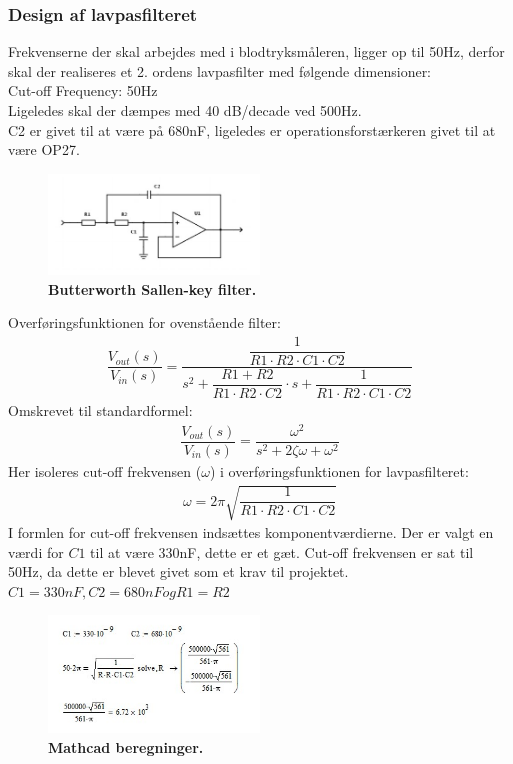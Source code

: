 \subsubsection{Design af lavpasfilteret}
Frekvenserne der skal arbejdes med i blodtryksmåleren, ligger op til 50Hz, derfor skal der realiseres et 2. ordens lavpasfilter med følgende dimensioner:\\
Cut-off Frequency: 50Hz\\
Ligeledes skal der dæmpes med 40 dB/decade ved 500Hz.\\
C2 er givet til at være på 680nF, ligeledes er operationsforstærkeren givet til at være OP27.
\begin{figure}[H]
\includegraphics[width =0.5\textwidth , center]{billeder/lavpas}
\caption{\textbf{Butterworth Sallen-key filter.}}
\end{figure}
Overføringsfunktionen for ovenstående filter:
\begin{align}
\dfrac{V_{out}(s)}{V_{in}(s)}=\dfrac{\dfrac{1}{R1\cdot R2\cdot C1\cdot C2}}{s^2+\dfrac{R1 + R2}{R1\cdot R2\cdot C2}\cdot s+\dfrac{1}{R1\cdot R2\cdot C1\cdot C2}}
\end{align}
Omskrevet til standardformel:
\begin{align}
\dfrac{V_{out}(s)}{V_{in}(s)}=\dfrac{\omega^2}{s^2+2\zeta\omega+\omega^2}
\end{align}
Her isoleres cut-off frekvensen ($\omega$) i overføringsfunktionen for lavpasfilteret:
\begin{align}
\omega = 2\pi\sqrt{\dfrac{1}{R1\cdot R2\cdot C1\cdot C2}}
\end{align}
I formlen for cut-off frekvensen indsættes komponentværdierne. Der er valgt en værdi for $C1$ til at være 330nF, dette er et gæt. Cut-off frekvensen er sat til 50Hz, da dette er blevet givet som et krav til projektet.\\
$C1 = 330nF, C2=680nF og R1=R2$
\begin{figure}[H]
\includegraphics[width =0.5\textwidth , center]{billeder/mathcad}
\caption{\textbf{Mathcad beregninger.}}
\end{figure}
